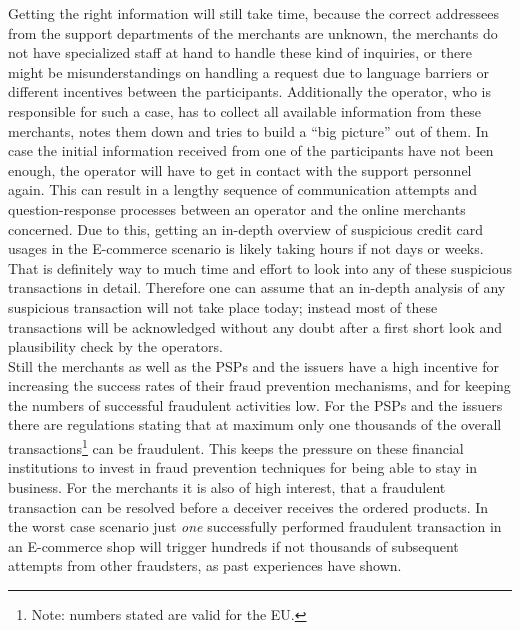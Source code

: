 Getting the right information will still take time, because the correct addressees from the support departments of the merchants are unknown, the merchants do not have specialized staff at hand to handle these kind of inquiries, or there might be misunderstandings on handling a request due to language barriers or different incentives between the participants. Additionally the operator, who is responsible for such a case, has to collect all available information from these merchants, notes them down and tries to build a ``big picture'' out of them. In case the initial information received from one of the participants have not been enough, the operator will have to get in contact with the support personnel again. This can result in a lengthy sequence of communication attempts and question-response processes between an operator and the online merchants concerned. Due to this, getting an in-depth overview of suspicious credit card usages in the \gls{E-commerce} scenario is likely taking hours if not days or weeks. That is definitely way to much time and effort to look into any of these suspicious transactions in detail. Therefore one can assume that an in-depth analysis of any suspicious transaction will not take place today; instead most of these transactions will be acknowledged without any doubt after a first short look and plausibility check by the operators. \\

Still the merchants as well as the \gls{PSP}s and the issuers have a high incentive for increasing the success rates of their fraud prevention mechanisms, and for keeping the numbers of successful fraudulent activities low. For the \gls{PSP}s and the issuers there are regulations stating that at maximum only one thousands of the overall transactions\footnote{Note: numbers stated are valid for the EU.} can be fraudulent. This keeps the pressure on these financial institutions to invest in fraud prevention techniques for being able to stay in business. For the merchants it is also of high interest, that a fraudulent transaction can be resolved before a deceiver receives the ordered products. In the worst case scenario just \emph{one} successfully performed fraudulent transaction in an \gls{E-commerce} shop will trigger hundreds if not thousands of subsequent attempts from other fraudsters, as past experiences have shown.



